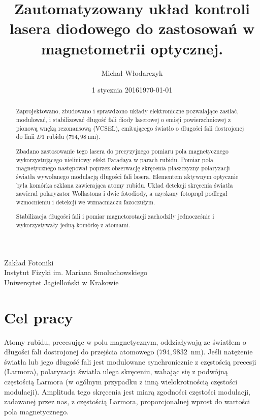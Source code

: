 \documentclass[a4paper,10pt]{article}
\date{1 stycznia 2016}
\title{Zautomatyzowany układ kontroli lasera diodowego do zastosowań w magnetometrii optycznej.}
\author{Michał Włodarczyk}
\date{\footnotesize{\today}}
\begin{document}



\maketitle
\vspace{0.25\textheight}
\begin{large}
\centering
Zakład Fotoniki\\
Instytut Fizyki im. Mariana Smoluchowskiego\\
Uniwersytet Jagielloński w Krakowie\\
\end{large}
\thispagestyle{empty}

\newpage
\tableofcontents
\thispagestyle{plain}
\setcounter{page}{1}
\newpage

\begin{abstract}
Zaprojektowano, zbudowano i sprawdzono układy elektroniczne pozwalające zasilać, modulować, i stabilizować długość fali diody laserowej o emisji powierzchniowej z pionową wnęką rezonansową (VCSEL), emitującego światło o długości fali dostrojonej do linii $D1$ rubidu ($794{,}98~ \mathrm{nm}$).

Zbadano zastosowanie tego lasera do precyzyjnego pomiaru pola magnetycznego wykorzystującego nieliniowy efekt Faradaya w parach rubidu. Pomiar pola magnetycznego następował poprzez obserwację skręcenia płaszczyzny polaryzacji światła wywołanego modulacją długości fali lasera. Elementem aktywnym optycznie była komórka szklana zawierająca atomy rubidu.  Układ detekcji skręcenia światła zawierał polaryzator Wollastona i dwie fotodiody, a uzyskany fotoprąd podlegał wzmocnieniu i detekcji we wzmacniaczu fazoczułym. 

Stabilizacja długości fali i pomiar magnetorotacji zachodziły jednocześnie i wykorzystywały jedną komórkę z atomami.
 
\end{abstract}

\section{Cel pracy}



Atomy rubidu, precesując w polu magnetycznym, oddziaływają ze światłem o długości fali dostrojonej do przejścia atomowego ($794{,}9832$~nm).
Jeśli natężenie światła lub jego długość fali jest modulowane synchronicznie z częstością precesji (Larmora), polaryzacja światła ulega skręceniu, wahając się z podwójną częstością Larmora (w ogólnym przypadku z inną wielokrotnością częstości modulacji).
Amplituda tego skręcenia jest miarą zgodności częstości modulacji, zadawanej przez nas, z częstością Larmora, proporcjonalnej wprost do wartości pola magnetycznego. 
\end{document}
